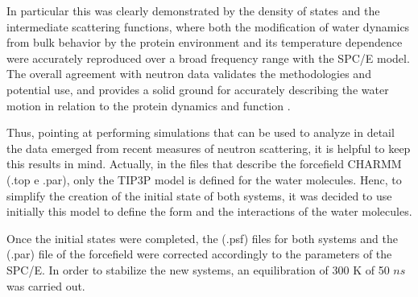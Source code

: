 In particular this was clearly demonstrated by the density of states and the intermediate scattering functions, where both the modification of water dynamics from bulk behavior by the protein environment and its temperature dependence were accurately reproduced over a broad frequency range with the SPC/E model. The overall agreement with neutron data validates the methodologies and potential use, and provides a solid ground for accurately describing the water motion in relation to the protein dynamics and function \cite{tarek2000dynamics}.

Thus, pointing at performing simulations that can be used to analyze in detail the data emerged from recent measures of neutron scattering, it is helpful to keep this results in mind. Actually, in the files that describe the forcefield CHARMM (.top e .par), only the TIP3P model is defined for the water molecules. Henc, to simplify the creation of the initial state of both systems, it was decided to use initially this model to define the form and the interactions of the water molecules.

Once the initial states were completed, the (.psf) files for both systems and the (.par) file of the forcefield were corrected accordingly to the parameters of the SPC/E. In order to stabilize the new systems, an equilibration of 300 K of 50 $ns$ was carried out.

